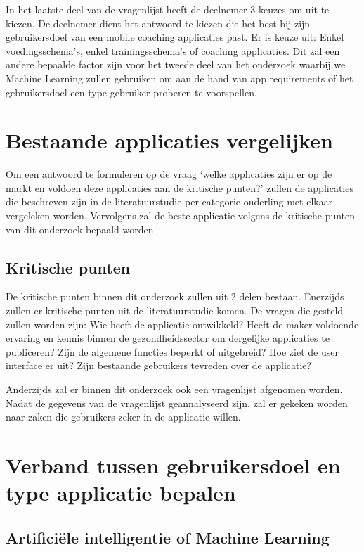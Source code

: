 In het laatste deel van de vragenlijst heeft de deelnemer 3 keuzes om uit te kiezen. De deelnemer dient het antwoord te kiezen die het best bij zijn gebruikersdoel van een mobile coaching applicaties past. Er is keuze uit: Enkel voedingsschema’s, enkel trainingsschema’s of coaching applicaties. Dit zal een andere bepaalde factor zijn voor het tweede deel van het onderzoek waarbij we Machine Learning zullen gebruiken om aan de hand van app requirements of het gebruikersdoel een type gebruiker proberen te voorspellen. 

\section{Bestaande applicaties vergelijken}
\label{sec:applicaties-vergelijken}

Om een antwoord te formuleren op de vraag ‘welke applicaties zijn er op de markt en voldoen deze applicaties aan de kritische punten?’ zullen de applicaties die beschreven zijn in de literatuurstudie per categorie onderling met elkaar vergeleken worden. Vervolgens zal de beste applicatie volgens de kritische punten van dit onderzoek bepaald worden. 

\newpage
\subsection{Kritische punten}

De kritische punten binnen dit onderzoek zullen uit 2 delen bestaan. Enerzijds zullen er kritische punten uit de literatuurstudie komen. De vragen die gesteld zullen worden zijn: Wie heeft de applicatie ontwikkeld? Heeft de maker voldoende ervaring en kennis binnen de gezondheidssector om dergelijke applicaties te publiceren? Zijn de algemene functies beperkt of uitgebreid? Hoe ziet de user interface er uit? Zijn bestaande gebruikers tevreden over de applicatie?

Anderzijds zal er binnen dit onderzoek ook een vragenlijst afgenomen worden. Nadat de gegevens van de vragenlijst geannalyseerd zijn, zal er gekeken worden naar zaken die gebruikers zeker in de applicatie willen. 

\section{Verband tussen gebruikersdoel en type applicatie bepalen }
\label{sec:machine-learning}

\subsection{Artificiële intelligentie of Machine Learning}

